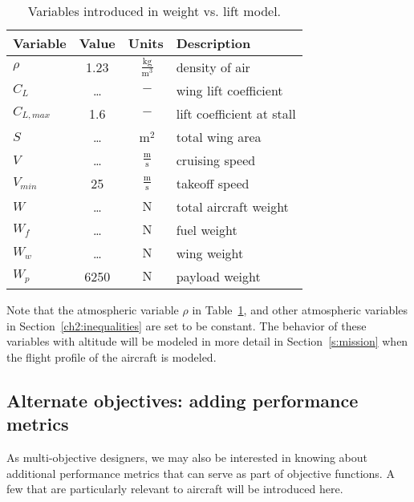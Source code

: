 \begin{footnotesize}
\begin{table}
    \centering
    \begin{tabular}{ l c c l}
        \toprule
        \textbf{Variable} & \textbf{Value} & \textbf{Units} & \textbf{Description} \\
        \midrule
        $\rho$ & 1.23 & $~\mathrm{\tfrac{kg}{m^{3}}}$ & density of air \\
        $C_L$ & \ldots & $~\mathrm{-}$ & wing lift coefficient \\
        $C_{L,max}$ & 1.6 & $~\mathrm{-}$ & lift coefficient at stall \\
        $S$ & \ldots & $~\mathrm{m^{2}}$ & total wing area \\
        $V$ & \ldots & $~\mathrm{\tfrac{m}{s}}$ & cruising speed \\
        $V_{min}$ & 25 & $~\mathrm{\tfrac{m}{s}}$ & takeoff speed \\
        $W$ & \ldots & $~\mathrm{N}$ & total aircraft weight \\
        $W_f$ & \ldots & $~\mathrm{N}$ & fuel weight \\
        $W_w$ & \ldots & $~\mathrm{N}$ & wing weight \\
        $W_p$ & 6250 & $~\mathrm{N}$ & payload weight \\
        \bottomrule
    \end{tabular}
    \caption{Variables introduced in weight vs. lift model.}
    \label{t:vars_WandL}
\end{table} \end{footnotesize}

Note that the atmospheric variable $\rho$ in Table~\ref{t:vars_WandL}, and other
atmospheric variables in Section~\ref{ch2:inequalities} are set
to be constant. The behavior of these variables with altitude
will be modeled in more detail in Section~\ref{s:mission} when
the flight profile of the aircraft is modeled.

\subsection{Alternate objectives: adding performance metrics}
\label{s:altobj}

As multi-objective designers, we may also be interested in knowing about
additional performance metrics that can serve as part of objective functions. A
few that are particularly relevant to aircraft will be introduced here.

